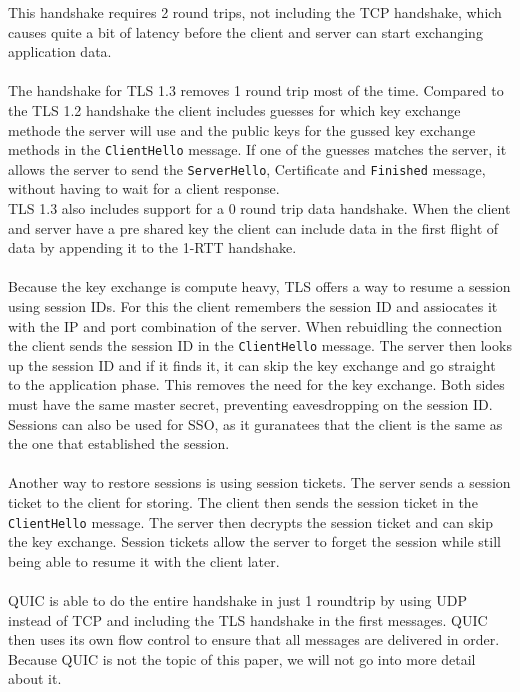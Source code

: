 This handshake requires 2 round trips, not including the TCP handshake, which causes quite a bit of latency before the client and server can start exchanging application data.
\\\\
The handshake for TLS 1.3 removes 1 round trip most of the time. Compared to the TLS 1.2 handshake the client includes guesses for which key exchange methode the server will use and the public keys for the gussed key exchange methods in the \texttt{ClientHello} message. If one of the guesses matches the server, it allows the server to send the \texttt{ServerHello}, Certificate and \texttt{Finished} message, without having to wait for a client response.
\\
TLS 1.3 also includes support for a 0 round trip data handshake. When the client and server have a pre shared key the client can include data in the first flight of data by appending it to the 1-RTT handshake.
\\\\
Because the key exchange is compute heavy, TLS offers a way to resume a session using session IDs. For this the client remembers the session ID and assiocates it with the IP and port combination of the server. When rebuidling the connection the client sends the session ID in the \texttt{ClientHello} message. The server then looks up the session ID and if it finds it, it can skip the key exchange and go straight to the application phase. This removes the need for the key exchange. Both sides must have the same master secret, preventing eavesdropping on the session ID. 
\\
Sessions can also be used for SSO, as it guranatees that the client is the same as the one that established the session.
\\\\
Another way to restore sessions is using session tickets. The server sends a session ticket to the client for storing. The client then sends the session ticket in the \texttt{ClientHello} message. The server then decrypts the session ticket and can skip the key exchange. Session tickets allow the server to forget the session while still being able to resume it with the client later.
\\\\
QUIC is able to do the entire handshake in just 1 roundtrip by using UDP instead of TCP and including the TLS handshake in the first messages. QUIC then uses its own flow control to ensure that all messages are delivered in order. Because QUIC is not the topic of this paper, we will not go into more detail about it.